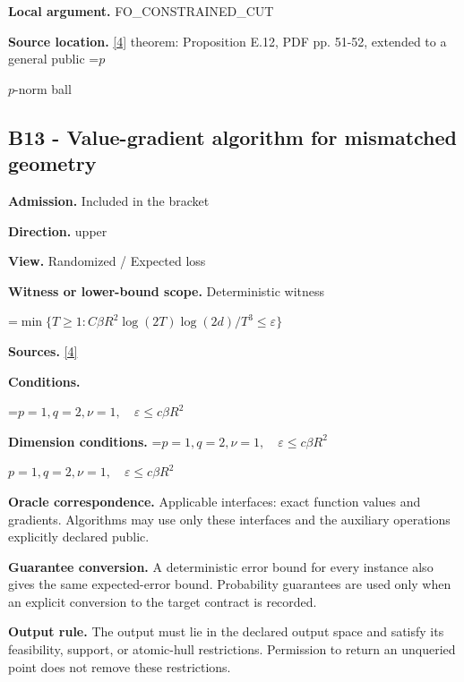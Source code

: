 \documentclass[10pt,a4paper]{article}
\newcommand{\AtlasMath}[1]{\par\begingroup\centering\setbox0=\hbox{$\displaystyle #1$}\ifdim\wd0>1.4\linewidth\typeout{ATLAS WIDE FORMULA: \the\wd0}\fi\ifdim\wd0>\linewidth\resizebox{\linewidth}{!}{\box0}\else\box0\fi\par\endgroup}
\newcommand{\AtlasInlineMath}[1]{\begingroup\setbox0=\hbox{$#1$}\ifdim\wd0>.4\linewidth\endgroup\AtlasMath{#1}\else\endgroup$#1$\fi}
\begin{document}
\textbf{Local argument.} FO\_CONSTRAINED\_CUT



\textbf{Source location.} \href{https://arxiv.org/pdf/2609.32910}{[4]} theorem: Proposition E.12, PDF pp. 51-52, extended to a general public \AtlasInlineMath{p}-norm ball



\subsection{B13 - Value-gradient algorithm for mismatched geometry}


\textbf{Admission.} Included in the bracket



\textbf{Direction.} upper



\textbf{View.} Randomized / Expected loss



\textbf{Witness or lower-bound scope.} Deterministic witness



\AtlasMath{\min\{T\ge1:C\beta R^2\log(2T)\log(2d)/T^3\le\varepsilon\}}


\textbf{Sources.} \href{https://arxiv.org/pdf/2609.32910}{[4]}



\textbf{Conditions.}
\AtlasMath{p=1,q=2,\nu=1,\quad\varepsilon\le c\beta R^2}




\textbf{Dimension conditions.} \AtlasInlineMath{p=1,q=2,\nu=1,\quad\varepsilon\le c\beta R^2}



\textbf{Oracle correspondence.} Applicable interfaces: exact function values and gradients. Algorithms may use only these interfaces and the auxiliary operations explicitly declared public.



\textbf{Guarantee conversion.} A deterministic error bound for every instance also gives the same expected-error bound. Probability guarantees are used only when an explicit conversion to the target contract is recorded.



\textbf{Output rule.} The output must lie in the declared output space and satisfy its feasibility, support, or atomic-hull restrictions. Permission to return an unqueried point does not remove these restrictions.
\end{document}
